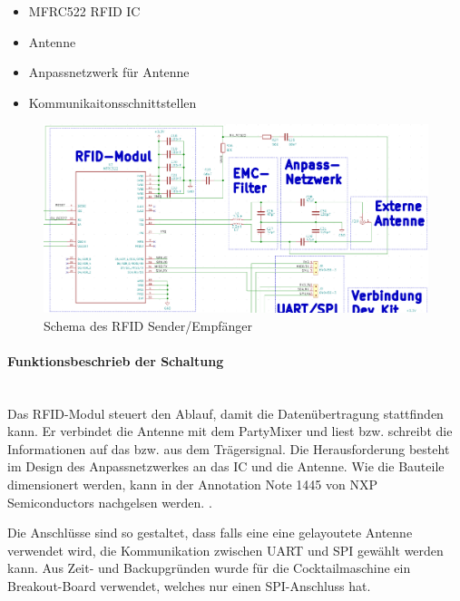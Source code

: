 \begin{itemize}
\item MFRC522 RFID IC
\item Antenne
\item Anpassnetzwerk für Antenne
\item Kommunikaitonsschnittstellen
\end{itemize}

\begin{figure}[!h]
\center
\includegraphics[width = \textwidth]{graphics/Schema_RFID}
\caption{Schema des RFID Sender/Empfänger}
\label{fig:Schema_RFID}
\end{figure}

\paragraph{Funktionsbeschrieb der Schaltung}\mbox{}\\

Das RFID-Modul steuert den Ablauf, damit die Datenübertragung stattfinden kann. Er verbindet die Antenne mit dem PartyMixer und liest bzw. schreibt die Informationen auf das bzw. aus dem Trägersignal. Die Herausforderung besteht im Design des Anpassnetzwerkes an das IC und die Antenne. Wie die Bauteile dimensionert werden, kann in der Annotation Note 1445 von NXP Semiconductors nachgelsen werden. \cite{nxp_bv_2010_antenna_2010}.

Die Anschlüsse sind so gestaltet, dass falls eine eine gelayoutete Antenne verwendet wird, die Kommunikation zwischen UART und SPI gewählt werden kann. Aus Zeit- und Backupgründen wurde für die Cocktailmaschine ein Breakout-Board verwendet, welches nur einen SPI-Anschluss hat.
